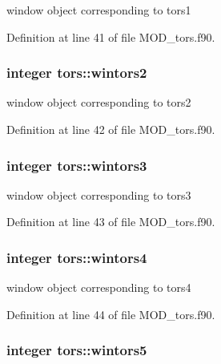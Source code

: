 window object corresponding to tors1 



Definition at line 41 of file M\-O\-D\-\_\-tors.\-f90.

\hypertarget{classtors_afd9aa88d6043185e43f36a3756b88f04}{
\subsubsection[{wintors2}]{\setlength{\rightskip}{0pt plus 5cm}integer tors\-::wintors2}}\label{classtors_afd9aa88d6043185e43f36a3756b88f04}


window object corresponding to tors2 



Definition at line 42 of file M\-O\-D\-\_\-tors.\-f90.

\hypertarget{classtors_a40da6c430e1053b805d3a5462c800ddb}{
\subsubsection[{wintors3}]{\setlength{\rightskip}{0pt plus 5cm}integer tors\-::wintors3}}\label{classtors_a40da6c430e1053b805d3a5462c800ddb}


window object corresponding to tors3 



Definition at line 43 of file M\-O\-D\-\_\-tors.\-f90.

\hypertarget{classtors_aab4285963a388f604971379adb71aa94}{
\subsubsection[{wintors4}]{\setlength{\rightskip}{0pt plus 5cm}integer tors\-::wintors4}}\label{classtors_aab4285963a388f604971379adb71aa94}


window object corresponding to tors4 



Definition at line 44 of file M\-O\-D\-\_\-tors.\-f90.

\hypertarget{classtors_aa77b9602856958a909ba63c480269d53}{
\subsubsection[{wintors5}]{\setlength{\rightskip}{0pt plus 5cm}integer tors\-::wintors5}}\label{classtors_aa77b9602856958a909ba63c480269d53}


